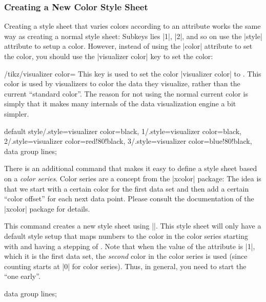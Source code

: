 \subsubsection{Creating a New Color Style Sheet}

Creating a style sheet that varies colors according to an attribute works the
same way as creating a normal style sheet: Subkeys lies |1|, |2|, and so on use
the |style| attribute to setup a color. However, instead of using the |color|
attribute to set the color, you should use the |visualizer color| key to set
the color:

\begin{key}{/tikz/visualizer color=}
    This key is used to set the color |visualizer color| to . This
    color is used by visualizers to color the data they visualize, rather than
    the current ``standard color''. The reason for not using the normal current
    color is simply that it makes many internals of the data visualization
    engine a bit simpler.
\begin{codeexample}[]
{
  default style/.style={visualizer color=black},
  1/.style={visualizer color=black},
  2/.style={visualizer color=red!80!black},
  3/.style={visualizer color=blue!80!black},
}
\tikz \datavisualization [
  school book axes,
  visualize as line=normal,
  visualize as line=heated,
  visualize as line=critical,
  style sheet=my colors]
data group {lines};
\end{codeexample}
\end{key}

There is an additional command that makes it easy to define a style sheet based
on a \emph{color series}. Color series are a concept from the |xcolor| package:
The idea is that we start with a certain color for the first data set and then
add a certain ``color offset'' for each next data point. Please consult the
documentation of the |xcolor| package for details.

\begin{command}{\tikzdvdeclarestylesheetcolorseries{}}
    This command creates a new style sheet using |\pgfdvdeclarestylesheet|.
    This style sheet will only have a default style setup that maps numbers to
    the color in the color series starting with  and having
    a stepping of . Note that when the value of the attribute is
    |1|, which it is the first data set, the \emph{second} color in the color
    series is used (since counting starts at |0| for color series). Thus, in
    general, you need to start the  ``one early''.
\begin{codeexample}[]
\tikz \datavisualization [
  school book axes,
  visualize as line=normal,
  visualize as line=heated,
  visualize as line=critical,
  style sheet=greens]
data group {lines};
\end{codeexample}
\end{command}


